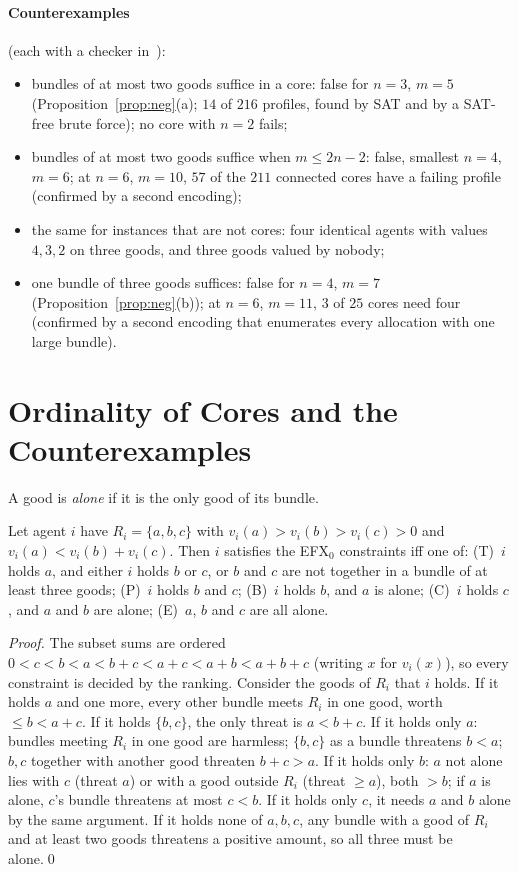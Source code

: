 \documentclass[runningheads,11pt]{llncs}
\newcommand{\efxz}{\texorpdfstring{\mbox{EFX$_0$}}{EFX0}}
\begin{document}
\paragraph{Counterexamples} (each with a checker in~\cite{Repo}):
\begin{itemize}
\item bundles of at most two goods suffice in a core: false for $n=3$, $m=5$ (Proposition~\ref{prop:neg}(a); $14$ of $216$ profiles, found by SAT and by a SAT-free brute force); no core with $n=2$ fails;
\item bundles of at most two goods suffice when $m\le2n-2$: false, smallest $n=4$, $m=6$; at $n=6$, $m=10$, $57$ of the $211$ connected cores have a failing profile (confirmed by a second encoding);
\item the same for instances that are not cores: four identical agents with values $4,3,2$ on three goods, and three goods valued by nobody;
\item one bundle of three goods suffices: false for $n=4$, $m=7$ (Proposition~\ref{prop:neg}(b)); at $n=6$, $m=11$, $3$ of $25$ cores need four (confirmed by a second encoding that enumerates every allocation with one large bundle).
\end{itemize}

\section{Ordinality of Cores and the Counterexamples}\label{app:neg}

A good is \emph{alone} if it is the only good of its bundle.

\begin{lemma}\label{lem:L5}
Let agent $i$ have $R_i=\{a,b,c\}$ with $v_i(a)>v_i(b)>v_i(c)>0$ and $v_i(a)<v_i(b)+v_i(c)$. Then $i$ satisfies the \efxz{} constraints iff one of: (T)~$i$ holds $a$, and either $i$ holds $b$ or $c$, or $b$ and $c$ are not together in a bundle of at least three goods; (P)~$i$ holds $b$ and $c$; (B)~$i$ holds $b$, and $a$ is alone; (C)~$i$ holds $c$, and $a$ and $b$ are alone; (E)~$a$, $b$ and $c$ are all alone.
\end{lemma}

\begin{proof}
The subset sums are ordered $0<c<b<a<b+c<a+c<a+b<a+b+c$ (writing $x$ for $v_i(x)$), so every constraint is decided by the ranking. Consider the goods of $R_i$ that $i$ holds. If it holds $a$ and one more, every other bundle meets $R_i$ in one good, worth $\le b<a+c$. If it holds $\{b,c\}$, the only threat is $a<b+c$. If it holds only $a$: bundles meeting $R_i$ in one good are harmless; $\{b,c\}$ as a bundle threatens $b<a$; $b,c$ together with another good threaten $b+c>a$. If it holds only $b$: $a$ not alone lies with $c$ (threat $a$) or with a good outside $R_i$ (threat $\ge a$), both $>b$; if $a$ is alone, $c$'s bundle threatens at most $c<b$. If it holds only $c$, it needs $a$ and $b$ alone by the same argument. If it holds none of $a,b,c$, any bundle with a good of $R_i$ and at least two goods threatens a positive amount, so all three must be alone.\qed
\end{proof}
\end{document}
